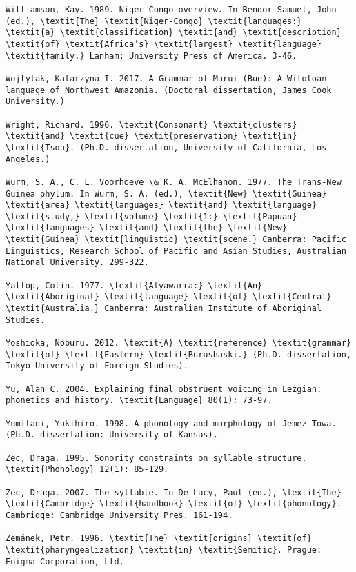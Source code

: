 \begin{verbatim}
Williamson, Kay. 1989. Niger-Congo overview. In Bendor-Samuel, John (ed.), \textit{The} \textit{Niger-Congo} \textit{languages:} \textit{a} \textit{classification} \textit{and} \textit{description} \textit{of} \textit{Africa’s} \textit{largest} \textit{language} \textit{family.} Lanham: University Press of America. 3-46.

Wojtylak, Katarzyna I. 2017. A Grammar of Murui (Bue): A Witotoan language of Northwest Amazonia. (Doctoral dissertation, James Cook University.)

Wright, Richard. 1996. \textit{Consonant} \textit{clusters} \textit{and} \textit{cue} \textit{preservation} \textit{in} \textit{Tsou}. (Ph.D. dissertation, University of California, Los Angeles.)

Wurm, S. A., C. L. Voorhoeve \& K. A. McElhanon. 1977. The Trans-New Guinea phylum. In Wurm, S. A. (ed.), \textit{New} \textit{Guinea} \textit{area} \textit{languages} \textit{and} \textit{language} \textit{study,} \textit{volume} \textit{1:} \textit{Papuan} \textit{languages} \textit{and} \textit{the} \textit{New} \textit{Guinea} \textit{linguistic} \textit{scene.} Canberra: Pacific Linguistics, Research School of Pacific and Asian Studies, Australian National University. 299-322.

Yallop, Colin. 1977. \textit{Alyawarra:} \textit{An} \textit{Aboriginal} \textit{language} \textit{of} \textit{Central} \textit{Australia.} Canberra: Australian Institute of Aboriginal Studies.

Yoshioka, Noburu. 2012. \textit{A} \textit{reference} \textit{grammar} \textit{of} \textit{Eastern} \textit{Burushaski.} (Ph.D. dissertation, Tokyo University of Foreign Studies).

Yu, Alan C. 2004. Explaining final obstruent voicing in Lezgian: phonetics and history. \textit{Language} 80(1): 73-97.

Yumitani, Yukihiro. 1998. A phonology and morphology of Jemez Towa. (Ph.D. dissertation: University of Kansas).

Zec, Draga. 1995. Sonority constraints on syllable structure. \textit{Phonology} 12(1): 85-129.

Zec, Draga. 2007. The syllable. In De Lacy, Paul (ed.), \textit{The} \textit{Cambridge} \textit{handbook} \textit{of} \textit{phonology}. Cambridge: Cambridge University Pres. 161-194.

Zemánek, Petr. 1996. \textit{The} \textit{origins} \textit{of} \textit{pharyngealization} \textit{in} \textit{Semitic}. Prague: Enigma Corporation, Ltd.


\end{verbatim}
